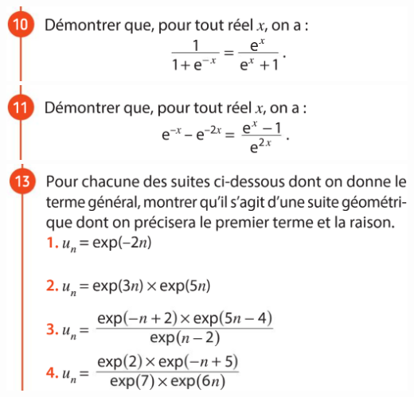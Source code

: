 \documentclass{article}
\begin{document}
\begin{center}
\begin{minipage}{0.45\textwidth}
\includegraphics[width=\textwidth]{Exercice_5.png}
\includegraphics[width=\textwidth]{Exercice_6.png}
\includegraphics[width=\textwidth]{Exercice_7.png}
\end{minipage}
\end{center}
\end{document}
